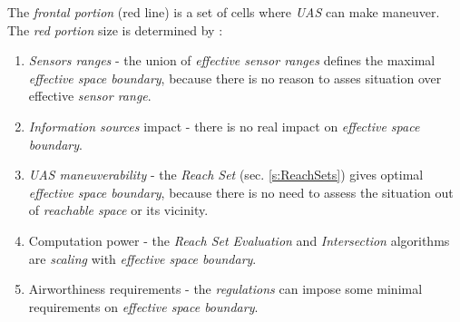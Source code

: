 The \emph{frontal portion} (red line) is a set of cells where \emph{UAS} can make maneuver. The \emph{red portion} size is determined by \cite{zaiane2002clustering}:

\begin{enumerate}
        \item \emph{Sensors ranges} - the union of \emph{effective sensor ranges} defines the maximal \emph{effective space boundary}, because there is no reason to asses situation over effective \emph{sensor range}.
        
        \item \emph{Information sources} impact - there is no real impact on \emph{effective space boundary}.
        
        \item \emph{UAS maneuverability} - the \emph{Reach Set} (sec. \ref{s:ReachSets}) gives optimal \emph{effective space boundary}, because there is no need to assess the situation out of \emph{reachable space} or its vicinity. 
        
        \item Computation power - the \emph{Reach Set Evaluation} and \emph{Intersection} algorithms are \emph{scaling} with \emph{effective space boundary}.
        
        \item Airworthiness requirements - the \emph{regulations} can impose some minimal requirements on \emph{effective space boundary}.
\end{enumerate}


